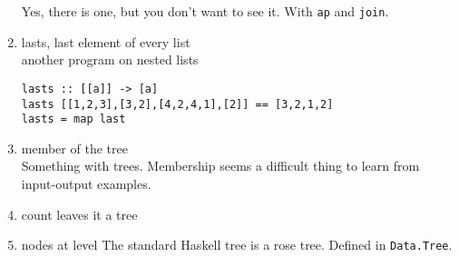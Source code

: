 \begin{enumerate}
	 Yes, there is one, but you don't want to see it. With \lstinline?ap? and \lstinline?join?.
%
	\item lasts, last element of every list \\
	another program on nested lists
	\begin{lstlisting}
lasts :: [[a]] -> [a]
lasts [[1,2,3],[3,2],[4,2,4,1],[2]] == [3,2,1,2]
lasts = map last
	\end{lstlisting}
%
	\item member of the tree\\
	Something with trees. Membership seems a difficult thing to learn from input-output examples.
%
	\item count leaves it a tree
%
	\item nodes at level
	The standard Haskell tree is a rose tree. Defined in \lstinline?Data.Tree?.
	
\end{enumerate}




